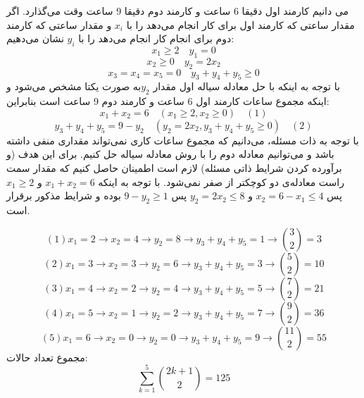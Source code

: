 \p
می دانیم کارمند اول دقیقا 6 ساعت و کارمند دوم دقیقا 9 ساعت وقت می‌گذارد.
اگر مقدار ساعتی که کارمند اول برای کار  انجام می‌دهد را با $x_i$ و مقدار ساعتی که کارمند دوم برای انجام کار   انجام می‌دهد را با $y_i$  نشان می‌دهیم:
$$ x_1 \geq 2 \quad y_1 = 0 $$
$$ x_2 \geq 0 \quad y_2 = 2x_2 $$
$$ x_3=x_4=x_5=0 \quad y_3  + y_4 + y_5 \geq 0 $$
\p
با توجه به اینکه با حل معادله سیاله اول مقدار $y_2$به صورت یکتا مشخص می‌شود و اینکه مجموع ساعات کارمند اول 6 ساعت و کارمند دوم 9 ساعت است بنابراین:
$$x_1 +x_2 = 6 \quad (x_1 \geq 2 , x_2 \geq  0)     \quad (1)$$
$$y_3 + y_4 + y_5 = 9-y_2 \quad (y_2 = 2x_2 , y_3 + y_4 + y_5  \geq 0) \quad (2)$$
\p
با توجه به ذات مسئله، می‌دانیم که مجموع ساعات کاری نمی‌تواند مقداری منفی داشته باشد و می‌توانیم معادله دوم را با روش معادله سیاله حل کنیم. برای این هدف (و برآورده کردن شرایط ذاتی مسئله) لازم است اطمینان حاصل کنیم که مقدار سمت راست معادله‌ی دو کوچکتر از صفر نمی‌شود. با توجه به اینکه
$x_1 + x_2 = 6$
و
$x_1 \geq 2$
پس
$x_2 = 6 - x_1 \leq 4$
و
$y_2 = 2x_2 \leq 8$
پس
$9 - y_2 \geq 1$
بوده و شرایط مذکور برقرار است.

$$ (1) x_1 = 2\rightarrow x_2=4 \rightarrow y_2=8 \rightarrow y_3+y_4+y_5 = 1 \rightarrow \binom{3}{2} = 3$$
$$ (2) x_1 = 3\rightarrow x_2=3 \rightarrow y_2=6 \rightarrow y_3+y_4+y_5 = 3 \rightarrow \binom{5}{2} = 10$$
$$ (3) x_1 = 4\rightarrow x_2=2 \rightarrow y_2= 4\rightarrow y_3+y_4+y_5 = 5 \rightarrow \binom{7}{2} = 21$$
$$ (4) x_1 = 5\rightarrow x_2=1 \rightarrow y_2=2 \rightarrow y_3+y_4+y_5 = 7 \rightarrow \binom{9}{2} = 36 $$
$$ (5) x_1 = 6\rightarrow x_2=0 \rightarrow y_2=0 \rightarrow y_3+y_4+y_5 = 9 \rightarrow \binom{11}{2} = 55 $$
\p
مجموع تعداد حالات: 
$$\sum_{k=1}^{5} \binom{2k+1}{2} = 125$$
